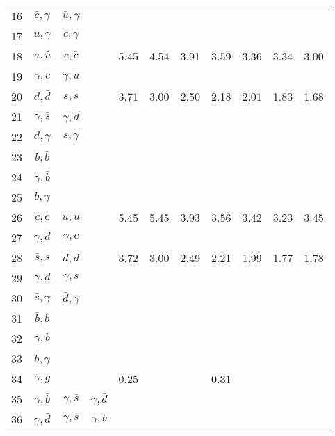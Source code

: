 \begin{tabular}{rccc@{}S@{}S@{}S@{}S@{}S@{}S@{}S}
  16 & $\bar c,\gamma$ & $\bar u,\gamma$ &                 &      &      &      &      &      &      & \\
  17 & $u,\gamma$      & $c,\gamma$      &                 &      &      &      &      &      &      & \\
  18 & $u,\bar u$      & $c,\bar c$      &                 & 5.45 & 4.54 & 3.91 & 3.59 & 3.36 & 3.34 & 3.00  \\
  19 & $\gamma,\bar c$ & $\gamma,\bar u$ &                 &      &      &      &      &      &      & \\
  20 & $d,\bar d$     & $s,\bar s$      &                 & 3.71 & 3.00 & 2.50 & 2.18 & 2.01 & 1.83 & 1.68  \\
  21 & $\gamma,\bar s$ & $\gamma,\bar d$ &                 &      &      &      &      &      &      & \\
  22 & $d,\gamma$      & $s,\gamma$      &                 &      &      &      &      &      &      & \\
  23 & $b,\bar b$      &                 &                 &      &      &      &      &      &      & \\
  24 & $\gamma,\bar b$ &                 &                 &      &      &      &      &      &      & \\
  25 & $b,\gamma$      &                 &                 &      &      &      &      &      &      & \\
  26 & $\bar c,c$      & $\bar u, u$     &                 & 5.45 & 5.45 & 3.93 & 3.56 & 3.42 & 3.23 & 3.45  \\
  27 & $\gamma, d$     & $\gamma, c$     &                 &      &      &      &      &      &      & \\
  28 & $\bar s,s$      & $\bar d, d$     &                 & 3.72 & 3.00 & 2.49 & 2.21 & 1.99 & 1.77 & 1.78 \\
  29 & $\gamma,d$      & $\gamma, s$     &                 &      &      &      &      &      &      & \\
  30 & $\bar s,\gamma$ & $\bar d,\gamma$ &                 &      &      &      &      &      &      & \\
  31 & $\bar b,b$      &                 &                 &      &      &      &      &      &      & \\
  32 & $\gamma, b$     &                 &                 &      &      &      &      &      &      & \\
  33 & $\bar b,\gamma$ &                 &                 &      &      &      &      &      &      & \\
  34 & $\gamma,g$      &                 &                 & 0.25 &      &      & 0.31 &      &      & \\
  35 & $\gamma,\bar b$ & $\gamma,\bar s$ & $\gamma,\bar d$ &      &      &      &      &      &      & \\
  36 & $\gamma,\bar d$ & $\gamma,s$      & $\gamma,b$      &      &      &      &      &      &      & \\
  \bottomrule
\end{tabular}
